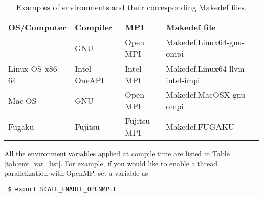 \begin{table}[htb]
\begin{center}
\caption{Examples of environments and their corresponding Makedef files.}
\begin{tabularx}{150mm}{|l|l|X|l|} \hline
 \rowcolor[gray]{0.9} OS/Computer & Compiler & MPI & Makedef file \\ \hline
                 & GNU & Open MPI & Makedef.Linux64-gnu-ompi \\ \cline{2-4}
 Linux OS x86-64 & Intel OneAPI   & Intel MPI & Makedef.Linux64-llvm-intel-impi \\ \hline
 Mac OS          & GNU            & Open MPI  & Makedef.MacOSX-gnu-ompi \\ \hline
 Fugaku          & Fujitsu        & Fujitsu MPI & Makedef.FUGAKU \\ \hline
\end{tabularx}
\label{tab:makedef}
\end{center}
\end{table}


All the environment variables applied at compile time are listed in Table \ref{tab:env_var_list}.
For example, if you would like to enable a thread parallelization with OpenMP, 
set a variable as
\begin{verbatim}
 $ export SCALE_ENABLE_OPENMP=T
\end{verbatim}

